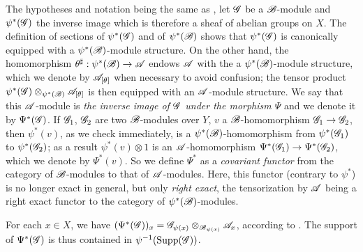 \begin{env}[4.3.1]
\label{0.4.3.1}
The hypotheses and notation being the same as , let $\mathscr{G}$ be
a $\mathscr{B}$-module and $\psi^*(\mathscr{G})$ the inverse image  which
is therefore a sheaf of abelian groups on $X$. The definition of sections of
$\psi^*(\mathscr{G})$ and of $\psi^*(\mathscr{B})$  shows that
$\psi^*(\mathscr{G})$ is canonically equipped with a $\psi^*(\mathscr{B})$-module
structure. On the other hand, the homomorphism
$\theta^\sharp:\psi^*(\sh{B})\to\sh{A}$ endows $\mathscr{A}$ with the a
$\psi^*(\mathscr{B})$-module structure, which we denote by $\mathscr{A}_{[\theta]}$ when
necessary to avoid confusion; the tensor product
$\psi^*(\mathscr{G})\otimes_{\psi^*(\mathscr{B})}\mathscr{A}_{[\theta]}$ is then equipped with
an $\mathscr{A}$-module structure. We say that this $\mathscr{A}$-module is \emph{the
inverse image of $\mathscr{G}$ under the morphism $\Psi$}
and we denote it by $\Psi^*(\mathscr{G})$. If $\mathscr{G}_1$, $\mathscr{G}_2$ are two
$\mathscr{B}$-modules over $Y$, $v$ a $\mathscr{B}$-homomorphism $\sh{G}_1\to\sh{G}_2$,
then $\psi^*(v)$, as we check immediately, is a $\psi^*(\mathscr{B})$-homomorphism
from $\psi^*(\mathscr{G}_1)$ to $\psi^*(\mathscr{G}_2)$; as a result $\psi^*(v)\otimes 1$
is an $\mathscr{A}$-homomorphism $\Psi^*(\sh{G}_1)\to\Psi^*(\sh{G}_2)$, which we
denote by $\Psi^*(v)$. So we define $\Psi^*$ as a \emph{covariant functor} from
the category of $\mathscr{B}$-modules to that of $\mathscr{A}$-modules. Here, this functor
(contrary to $\psi^*$) is no longer exact in general, but only \emph{right
exact}, the tensorization by $\mathscr{A}$ being a right exact functor to the
category of $\psi^*(\mathscr{B})$-modules.

For each $x\in X$, we have
$(\Psi^*(\mathscr{G}))_x=\mathscr{G}_{\psi(x)}\otimes_{\mathscr{B}_{\psi(x)}}\mathscr{A}_x$,
according to . The support of $\Psi^*(\mathscr{G})$ is thus
contained in $\psi^{-1}({\mathop{\mathrm{Supp}}\nolimits}(\mathscr{G}))$.
\end{env}


